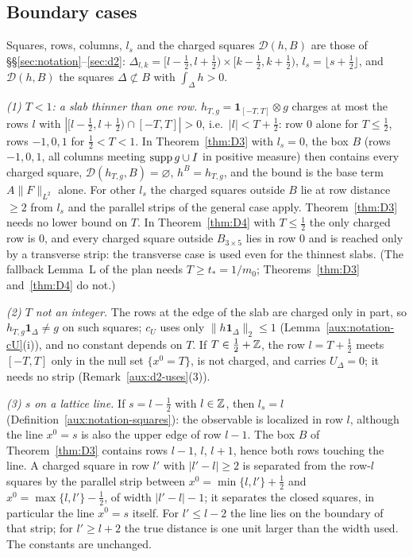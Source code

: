 \subsection{Boundary cases}\label{sec:quant-boundary}

Squares, rows, columns, $l_s$ and the charged squares $\mathcal D(h,B)$ are those of
\S\S\ref{sec:notation}--\ref{sec:d2}: $\Delta_{l,k}=[l-\frac12,l+\frac12)\times
[k-\frac12,k+\frac12)$, $l_s=\lfloor s+\frac12\rfloor$, and $\mathcal D(h,B)$ the squares
$\Delta\not\subset B$ with $\int_\Delta h>0$.

\emph{(1) $T<1$: a slab thinner than one row.} $h_{T,g}=\mathbf 1_{[-T,T]}\otimes g$ charges at
most the rows $l$ with $|[l-\frac12,l+\frac12)\cap[-T,T]|>0$, i.e.\ $|l|<T+\frac12$: row $0$
alone for $T\le\frac12$, rows $-1,0,1$ for $\frac12<T<1$. In Theorem~\ref{thm:D3} with
$l_s=0$, the box $B$ (rows $-1,0,1$, all columns meeting $\operatorname{supp} g\cup I$ in positive measure)
then contains every charged square, $\mathcal D(h_{T,g},B)=\varnothing$, $h^B=h_{T,g}$, and the
bound is the base term $A\|F\|_{L^2}$ alone. For other $l_s$ the charged squares outside $B$ lie
at row distance $\ge2$ from $l_s$ and the parallel strips of the general case apply.
Theorem~\ref{thm:D3} needs no lower bound on $T$. In Theorem~\ref{thm:D4} with $T\le\frac12$
the only charged row is $0$, and every charged square outside $B_{3\times5}$ lies in row $0$
and is reached only by a transverse strip: the transverse case is used even for the thinnest
slabs. (The fallback Lemma~L of the plan needs $T\ge t_*=1/m_0$; Theorems~\ref{thm:D3}
and~\ref{thm:D4} do not.)

\emph{(2) $T$ not an integer.} The rows at the edge of the slab are charged only in part, so
$h_{T,g}\mathbf 1_\Delta\ne g$ on such squares; $c_U$ uses only
$\|h\mathbf 1_\Delta\|_2\le1$ (Lemma~\ref{aux:notation-cU}(i)), and no constant depends on $T$.
If $T\in\frac12+\mathbb{Z}$, the row $l=T+\frac12$ meets $[-T,T]$ only in the null set $\{x^0=T\}$, is
not charged, and carries $U_\Delta=0$; it needs no strip (Remark~\ref{aux:d2-uses}(3)).

\emph{(3) $s$ on a lattice line.} If $s=l-\frac12$ with $l\in\mathbb{Z}$, then $l_s=l$
(Definition~\ref{aux:notation-squares}): the observable is localized in row $l$, although the
line $x^0=s$ is also the upper edge of row $l-1$. The box $B$ of Theorem~\ref{thm:D3} contains
rows $l-1$, $l$, $l+1$, hence both rows touching the line. A charged square in row $l'$ with
$|l'-l|\ge2$ is separated from the row-$l$ squares by the parallel strip between
$x^0=\min\{l,l'\}+\frac12$ and $x^0=\max\{l,l'\}-\frac12$, of width $|l'-l|-1$; it separates the
closed squares, in particular the line $x^0=s$ itself. For $l'\le l-2$ the line lies on the
boundary of that strip; for $l'\ge l+2$ the true distance is one unit larger than the width
used. The constants are unchanged.

